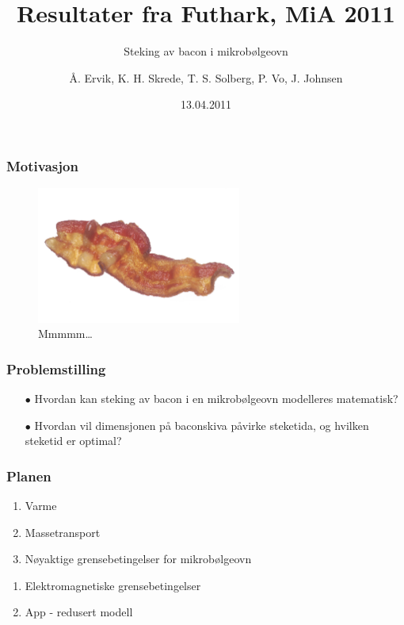 \documentclass[screen]{beamer}
\title[Resultater \wb]{Resultater fra Futhark, MiA 2011}
\subtitle{Steking av bacon i mikrobølgeovn}
\author[Futhark]{Å. Ervik, K. H. Skrede, T. S. Solberg, P. Vo, J. Johnsen}
\institute[NTNU]{Eksperter i Team, NTNU}
\date{13.04.2011}
\newcounter{saveenumi}
\begin{document}
\ntnutitlepage

\begin{frame}
  \frametitle{Motivasjon}
  \begin{center}
  \begin{figure}[!h]
    \begin{center}
      \includegraphics[width=0.6\textwidth]{bacon.png}
    \end{center}
    \caption{Mmmmm\ldots}
  \end{figure}
  \end{center}
\end{frame}

\begin{frame} 
  \frametitle{Problemstilling} 
  \begin{center} 
  \begin{itemize} 
  \item[$\bullet$] Hvordan kan steking av bacon i en mikrobølgeovn modelleres matematisk? 
  \item[$\bullet$] Hvordan vil dimensjonen på baconskiva påvirke steketida, og hvilken steketid er optimal? 
  \end{itemize} 
  \end{center} 
\end{frame}

\begin{frame}
  \frametitle{Planen}
  \begin{enumerate}
  \item Varme
  \item Massetransport
  \item Nøyaktige grensebetingelser for mikrobølgeovn
    \setcounter{saveenumi}{\theenumi}
\end{enumerate}
    \hline
\begin{enumerate}
    \setcounter{enumi}{\thesaveenumi}
  \item Elektromagnetiske grensebetingelser
  \item App - redusert modell
  \end{enumerate}
\end{frame}
\end{document}
